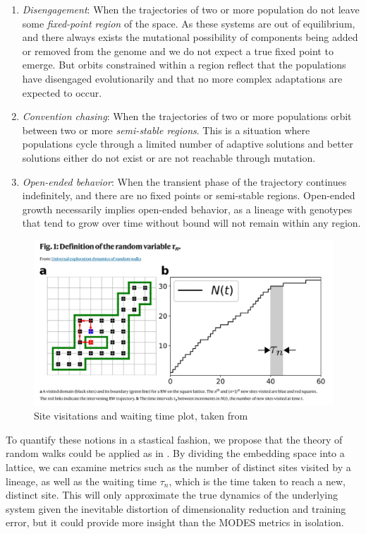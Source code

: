 \documentclass{article}
\begin{document}
\begin{enumerate}
    \item \textit{Disengagement}: When the trajectories of two or more population do not leave some 
        \textit{fixed-point region} of the space. As these systems are out of equilibrium, and
        there always exists the mutational possibility of components being added or removed from
        the genome and we do not expect a true fixed point to emerge. But orbits constrained within
        a region reflect that the populations have disengaged evolutionarily and that no more 
        complex adaptations are expected to occur.
    \item \textit{Convention chasing}: When the trajectories of two or more populations orbit between two
        or more \textit{semi-stable regions}. This is a situation where populations cycle through a limited 
        number of adaptive solutions and better solutions either do not exist or are
        not reachable through mutation. 
    \item \textit{Open-ended behavior}: When the transient phase of the trajectory continues indefinitely,
        and there are no fixed points or semi-stable regions. Open-ended growth necessarily implies
        open-ended behavior, as a lineage with genotypes that tend to grow over time without 
        bound will not remain within any region.
\end{enumerate}

\begin{figure}[H]
    \begin{center}
        \includegraphics[width=4.5in]{random-walker.png}
        \caption{Site visitations and waiting time plot, taken from \cite{Regnier2023}}
        \label{walker}
    \end{center}
\end{figure}

To quantify these notions in a stastical fashion, we propose that the theory of random walks 
could be applied as in \cite{Regnier2023}. By dividing the embedding space into a lattice, we can examine metrics 
such as the number of distinct sites visited by a lineage, as well as the waiting time $\tau_{n}$,
which is the time taken to reach a new, distinct site. This will only approximate the true dynamics
of the underlying system given the inevitable distortion of dimensionality reduction and training
error, but it could provide more insight than the MODES metrics in isolation.
\end{document}

